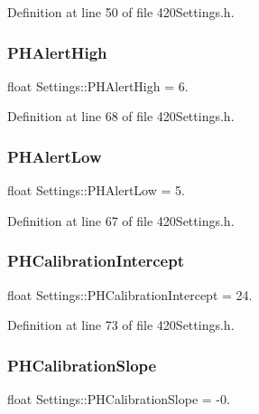 Definition at line 50 of file 420\+Settings.\+h.

\mbox{\label{struct_settings_a0b23f8b8b2d5d18b7b5a7b7802e98ce2}} 
\subsubsection{\texorpdfstring{PHAlertHigh}{PHAlertHigh}}
{\footnotesize\ttfamily float Settings\+::\+P\+H\+Alert\+High = 6.}



Definition at line 68 of file 420\+Settings.\+h.

\mbox{\label{struct_settings_a07b5f64fee695eab010c9e2e253cd683}} 
\subsubsection{\texorpdfstring{PHAlertLow}{PHAlertLow}}
{\footnotesize\ttfamily float Settings\+::\+P\+H\+Alert\+Low = 5.}



Definition at line 67 of file 420\+Settings.\+h.

\mbox{\label{struct_settings_a293248c61a8ef83275ab2881db22aa01}} 
\subsubsection{\texorpdfstring{PHCalibrationIntercept}{PHCalibrationIntercept}}
{\footnotesize\ttfamily float Settings\+::\+P\+H\+Calibration\+Intercept = 24.}



Definition at line 73 of file 420\+Settings.\+h.

\mbox{\label{struct_settings_af42cd4f0378498410447b2da93c0517f}} 
\subsubsection{\texorpdfstring{PHCalibrationSlope}{PHCalibrationSlope}}
{\footnotesize\ttfamily float Settings\+::\+P\+H\+Calibration\+Slope = -\/0.}



